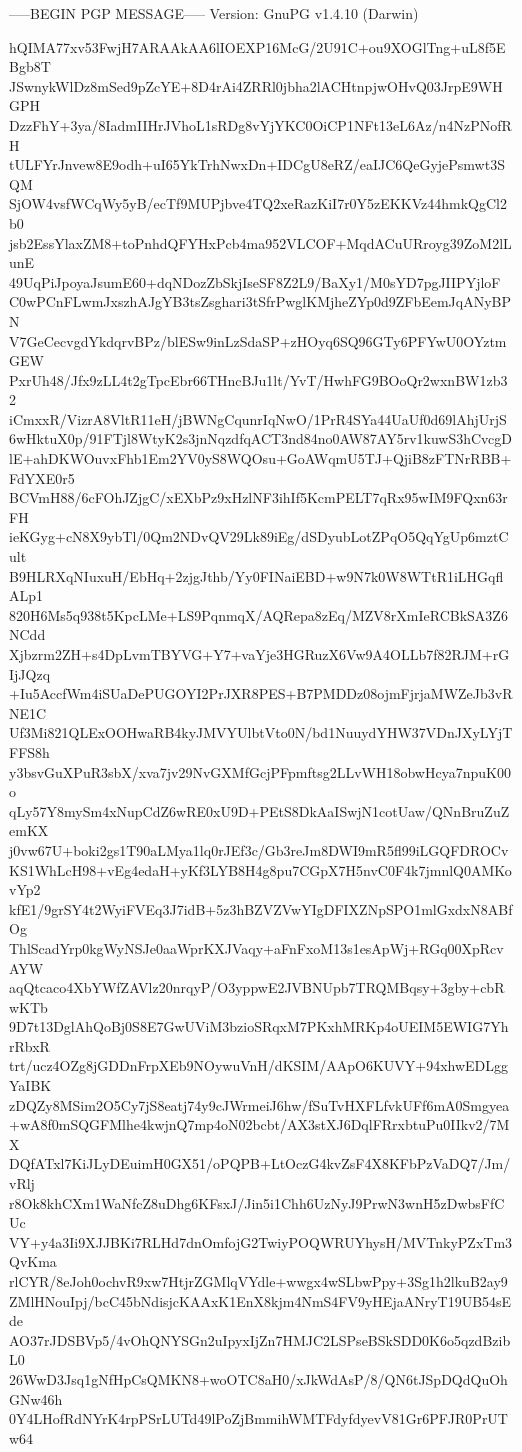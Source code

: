 -----BEGIN PGP MESSAGE-----
Version: GnuPG v1.4.10 (Darwin)

hQIMA77xv53FwjH7ARAAkAA6lIOEXP16McG/2U91C+ou9XOGlTng+uL8f5EBgb8T
JSwnykWlDz8mSed9pZcYE+8D4rAi4ZRRl0jbha2lACHtnpjwOHvQ03JrpE9WHGPH
DzzFhY+3ya/8IadmIIHrJVhoL1sRDg8vYjYKC0OiCP1NFt13eL6Az/n4NzPNofRH
tULFYrJnvew8E9odh+uI65YkTrhNwxDn+IDCgU8eRZ/eaIJC6QeGyjePsmwt3SQM
SjOW4vsfWCqWy5yB/ecTf9MUPjbve4TQ2xeRazKiI7r0Y5zEKKVz44hmkQgCl2b0
jsb2EssYlaxZM8+toPnhdQFYHxPcb4ma952VLCOF+MqdACuURroyg39ZoM2lLunE
49UqPiJpoyaJsumE60+dqNDozZbSkjIseSF8Z2L9/BaXy1/M0sYD7pgJIIPYjloF
C0wPCnFLwmJxszhAJgYB3tsZsghari3tSfrPwglKMjheZYp0d9ZFbEemJqANyBPN
V7GeCecvgdYkdqrvBPz/blESw9inLzSdaSP+zHOyq6SQ96GTy6PFYwU0OYztmGEW
PxrUh48/Jfx9zLL4t2gTpcEbr66THncBJu1lt/YvT/HwhFG9BOoQr2wxnBW1zb32
iCmxxR/VizrA8VltR11eH/jBWNgCqunrIqNwO/1PrR4SYa44UaUf0d69lAhjUrjS
6wHktuX0p/91FTjl8WtyK2s3jnNqzdfqACT3nd84no0AW87AY5rv1kuwS3hCvcgD
lE+ahDKWOuvxFhb1Em2YV0yS8WQOsu+GoAWqmU5TJ+QjiB8zFTNrRBB+FdYXE0r5
BCVmH88/6cFOhJZjgC/xEXbPz9xHzlNF3ihIf5KcmPELT7qRx95wIM9FQxn63rFH
ieKGyg+cN8X9ybTl/0Qm2NDvQV29Lk89iEg/dSDyubLotZPqO5QqYgUp6mztCult
B9HLRXqNIuxuH/EbHq+2zjgJthb/Yy0FINaiEBD+w9N7k0W8WTtR1iLHGqflALp1
820H6Ms5q938t5KpcLMe+LS9PqnmqX/AQRepa8zEq/MZV8rXmIeRCBkSA3Z6NCdd
Xjbzrm2ZH+s4DpLvmTBYVG+Y7+vaYje3HGRuzX6Vw9A4OLLb7f82RJM+rGIjJQzq
+Iu5AccfWm4iSUaDePUGOYI2PrJXR8PES+B7PMDDz08ojmFjrjaMWZeJb3vRNE1C
Uf3Mi821QLExOOHwaRB4kyJMVYUlbtVto0N/bd1NuuydYHW37VDnJXyLYjTFFS8h
y3bsvGuXPuR3sbX/xva7jv29NvGXMfGcjPFpmftsg2LLvWH18obwHcya7npuK00o
qLy57Y8mySm4xNupCdZ6wRE0xU9D+PEtS8DkAaISwjN1cotUaw/QNnBruZuZemKX
j0vw67U+boki2gs1T90aLMya1lq0rJEf3c/Gb3reJm8DWI9mR5fl99iLGQFDROCv
KS1WhLcH98+vEg4edaH+yKf3LYB8H4g8pu7CGpX7H5nvC0F4k7jmnlQ0AMKovYp2
kfE1/9grSY4t2WyiFVEq3J7idB+5z3hBZVZVwYIgDFIXZNpSPO1mlGxdxN8ABfOg
ThlScadYrp0kgWyNSJe0aaWprKXJVaqy+aFnFxoM13s1esApWj+RGq00XpRcvAYW
aqQtcaco4XbYWfZAVlz20nrqyP/O3yppwE2JVBNUpb7TRQMBqsy+3gby+cbRwKTb
9D7t13DglAhQoBj0S8E7GwUViM3bzioSRqxM7PKxhMRKp4oUEIM5EWIG7YhrRbxR
trt/ucz4OZg8jGDDnFrpXEb9NOywuVnH/dKSIM/AApO6KUVY+94xhwEDLggYaIBK
zDQZy8MSim2O5Cy7jS8eatj74y9cJWrmeiJ6hw/fSuTvHXFLfvkUFf6mA0Smgyea
+wA8f0mSQGFMlhe4kwjnQ7mp4oN02bcbt/AX3stXJ6DqlFRrxbtuPu0IIkv2/7MX
DQfATxl7KiJLyDEuimH0GX51/oPQPB+LtOczG4kvZsF4X8KFbPzVaDQ7/Jm/vRlj
r8Ok8khCXm1WaNfcZ8uDhg6KFsxJ/Jin5i1Chh6UzNyJ9PrwN3wnH5zDwbsFfCUc
VY+y4a3Ii9XJJBKi7RLHd7dnOmfojG2TwiyPOQWRUYhysH/MVTnkyPZxTm3QvKma
rlCYR/8eJoh0ochvR9xw7HtjrZGMlqVYdle+wwgx4wSLbwPpy+3Sg1h2lkuB2ay9
ZMlHNouIpj/bcC45bNdisjcKAAxK1EnX8kjm4NmS4FV9yHEjaANryT19UB54sEde
AO37rJDSBVp5/4vOhQNYSGn2uIpyxIjZn7HMJC2LSPseBSkSDD0K6o5qzdBzibL0
26WwD3Jsq1gNfHpCsQMKN8+woOTC8aH0/xJkWdAsP/8/QN6tJSpDQdQuOhGNw46h
0Y4LHofRdNYrK4rpPSrLUTd49lPoZjBmmihWMTFdyfdyevV81Gr6PFJR0PrUTw64
